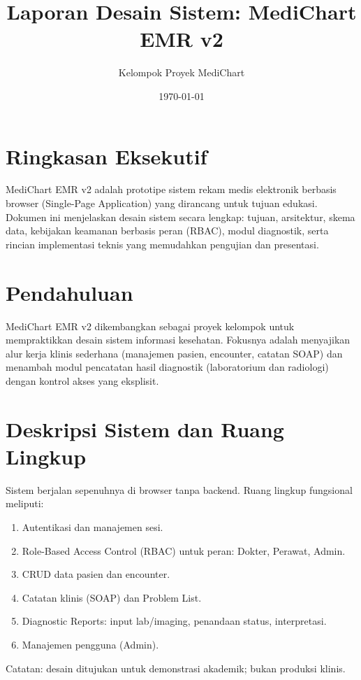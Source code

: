 \documentclass[12pt,a4paper]{article}
\title{Laporan Desain Sistem: MediChart EMR v2}
\author{Kelompok Proyek MediChart}
\date{\today}
\begin{document}
\maketitle

\section*{Ringkasan Eksekutif}
MediChart EMR v2 adalah prototipe sistem rekam medis elektronik berbasis browser (Single-Page Application) yang dirancang untuk tujuan edukasi. Dokumen ini menjelaskan desain sistem secara lengkap: tujuan, arsitektur, skema data, kebijakan keamanan berbasis peran (RBAC), modul diagnostik, serta rincian implementasi teknis yang memudahkan pengujian dan presentasi.

\tableofcontents
\newpage

\section{Pendahuluan}
MediChart EMR v2 dikembangkan sebagai proyek kelompok untuk mempraktikkan desain sistem informasi kesehatan. Fokusnya adalah menyajikan alur kerja klinis sederhana (manajemen pasien, encounter, catatan SOAP) dan menambah modul pencatatan hasil diagnostik (laboratorium dan radiologi) dengan kontrol akses yang eksplisit.

\section{Deskripsi Sistem dan Ruang Lingkup}
Sistem berjalan sepenuhnya di browser tanpa backend. Ruang lingkup fungsional meliputi:
\begin{enumerate}[leftmargin=1.2cm]
  \item Autentikasi dan manajemen sesi.
  \item Role-Based Access Control (RBAC) untuk peran: Dokter, Perawat, Admin.
  \item CRUD data pasien dan encounter.
  \item Catatan klinis (SOAP) dan Problem List.
  \item Diagnostic Reports: input lab/imaging, penandaan status, interpretasi.
  \item Manajemen pengguna (Admin).
\end{enumerate}

Catatan: desain ditujukan untuk demonstrasi akademik; bukan produksi klinis.
\end{document}
